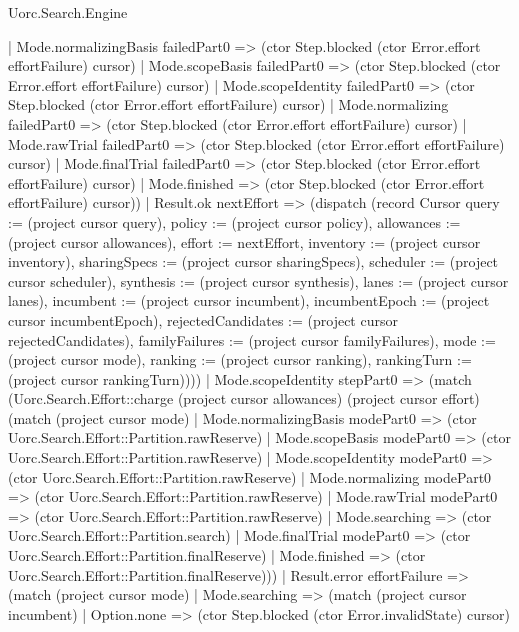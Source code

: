 \begin{lexlean}{Uorc.Search.Engine}
\begin{semanticmodule}
{        | Mode.normalizingBasis failedPart0 => (ctor Step.blocked (ctor Error.effort effortFailure) cursor)
        | Mode.scopeBasis failedPart0 => (ctor Step.blocked (ctor Error.effort effortFailure) cursor)
        | Mode.scopeIdentity failedPart0 => (ctor Step.blocked (ctor Error.effort effortFailure) cursor)
        | Mode.normalizing failedPart0 => (ctor Step.blocked (ctor Error.effort effortFailure) cursor)
        | Mode.rawTrial failedPart0 => (ctor Step.blocked (ctor Error.effort effortFailure) cursor)
        | Mode.finalTrial failedPart0 => (ctor Step.blocked (ctor Error.effort effortFailure) cursor)
        | Mode.finished => (ctor Step.blocked (ctor Error.effort effortFailure) cursor))
      | Result.ok nextEffort => (dispatch (record Cursor {query := (project cursor query), policy := (project cursor policy), allowances := (project cursor allowances), effort := nextEffort, inventory := (project cursor inventory), sharingSpecs := (project cursor sharingSpecs), scheduler := (project cursor scheduler), synthesis := (project cursor synthesis), lanes := (project cursor lanes), incumbent := (project cursor incumbent), incumbentEpoch := (project cursor incumbentEpoch), rejectedCandidates := (project cursor rejectedCandidates), familyFailures := (project cursor familyFailures), mode := (project cursor mode), ranking := (project cursor ranking), rankingTurn := (project cursor rankingTurn)})))
    | Mode.scopeIdentity stepPart0 => (match (Uorc.Search.Effort::charge (project cursor allowances) (project cursor effort) (match (project cursor mode)
        | Mode.normalizingBasis modePart0 => (ctor Uorc.Search.Effort::Partition.rawReserve)
        | Mode.scopeBasis modePart0 => (ctor Uorc.Search.Effort::Partition.rawReserve)
        | Mode.scopeIdentity modePart0 => (ctor Uorc.Search.Effort::Partition.rawReserve)
        | Mode.normalizing modePart0 => (ctor Uorc.Search.Effort::Partition.rawReserve)
        | Mode.rawTrial modePart0 => (ctor Uorc.Search.Effort::Partition.rawReserve)
        | Mode.searching => (ctor Uorc.Search.Effort::Partition.search)
        | Mode.finalTrial modePart0 => (ctor Uorc.Search.Effort::Partition.finalReserve)
        | Mode.finished => (ctor Uorc.Search.Effort::Partition.finalReserve)))
      | Result.error effortFailure => (match (project cursor mode)
        | Mode.searching => (match (project cursor incumbent)
          | Option.none => (ctor Step.blocked (ctor Error.invalidState) cursor)
}
\end{semanticmodule}
\end{lexlean}
